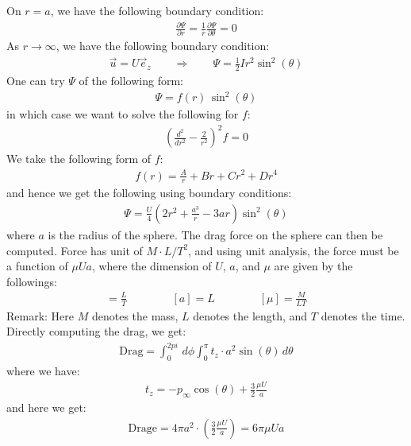 \documentclass[11pt]{book}
\theoremstyle{break}
\theoremstyle{break}
\newcommand{\pd}{\partial}
\newcommand{\remark}{\color{blue}Remark: \color{black}}
\begin{document}
On $r=a$, we have the following boundary condition:
\begin{align*}
\frac{\pd \Psi}{\pd r} = \frac{1}{r}\frac{\pd \Psi}{\pd \theta} = 0
\end{align*}
As $r \to \infty$, we have the following boundary condition:
\begin{align*}
\vec{u} = U \vec{e}_z \qquad\Rightarrow \qquad \Psi = \frac{1}{2}Ir^2 \sin^2(\theta)
\end{align*}
One can try $\Psi$ of the following form:
\begin{align*}
\Psi = f(r) \, \sin^2(\theta)
\end{align*}
in which case we want to solve the following for $f$:
\begin{align*}
\left( \frac{d^2}{dr^2} - \frac{2}{r^2}\right)^2 f = 0
\end{align*}
We take the following form of $f$:
\begin{align*}
f(r) = \frac{A}{r} + Br + Cr^2 + Dr^4
\end{align*}
and hence we get the following using boundary conditions:
\begin{align*}
\Psi = \frac{U}{4}\left( 2r^2 + \frac{a^3}{r} - 3ar \right) \sin^2(\theta)
\end{align*}
where $a$ is the radius of the sphere. The drag force on the sphere can then be computed. Force has unit of $M \cdot L/T^2$, and using unit analysis, the force must be a function of $\mu U a$, where the dimension of $U$, $a$, and $\mu$ are given by the followings:
\begin{align*}
[U] = \frac{L}{T} \qquad\qquad [a] = L \qquad\qquad [\mu] = \frac{M}{LT}
\end{align*}
\remark Here $M$ denotes the mass, $L$ denotes the length, and $T$ denotes the time.\\

Directly computing the drag, we get:
\begin{align*}
\text{Drag} = \int_0^{2pi}\, d\phi \int_0^\pi  t_z \cdot a^2 \sin(\theta)\, d\theta
\end{align*}
where we have:
\begin{align*}
t_z = -p_{\infty}\cos(\theta) + \frac{3}{2}\frac{\mu U}{a}
\end{align*}
and here we get:
\begin{align}
\text{Drage} = 4\pi a^2 \cdot \left( \frac{3}{2}\frac{\mu U}{a}\right) = 6\pi \mu U a \tag{Re$ = 0$}
\end{align}


\newpage
\end{document}
